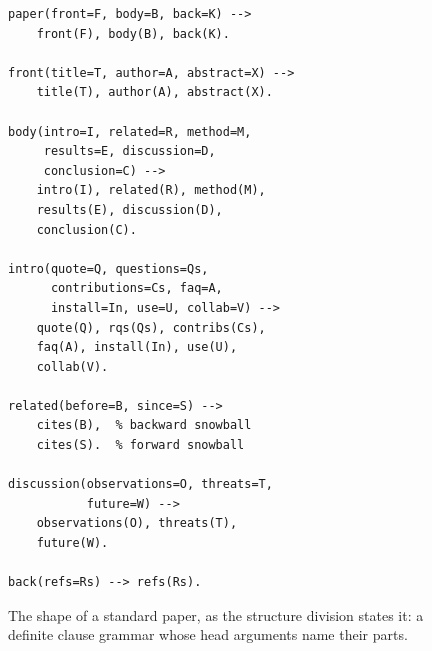 \begin{figure}[t]
\begin{lstlisting}
paper(front=F, body=B, back=K) -->
    front(F), body(B), back(K).

front(title=T, author=A, abstract=X) -->
    title(T), author(A), abstract(X).

body(intro=I, related=R, method=M,
     results=E, discussion=D,
     conclusion=C) -->
    intro(I), related(R), method(M),
    results(E), discussion(D),
    conclusion(C).

intro(quote=Q, questions=Qs,
      contributions=Cs, faq=A,
      install=In, use=U, collab=V) -->
    quote(Q), rqs(Qs), contribs(Cs),
    faq(A), install(In), use(U),
    collab(V).

related(before=B, since=S) -->
    cites(B),  % backward snowball
    cites(S).  % forward snowball

discussion(observations=O, threats=T,
           future=W) -->
    observations(O), threats(T),
    future(W).

back(refs=Rs) --> refs(Rs).
\end{lstlisting}
\caption{The shape of a standard paper, as the structure division states it: a definite clause grammar whose head arguments name their parts.}
\label{fig:bnf}
\end{figure}

\newcommand{\division}[2]{\par\noindent\textbf{#1}
\begin{itemize}#2
\end{itemize}\vspace{0.2em}}

